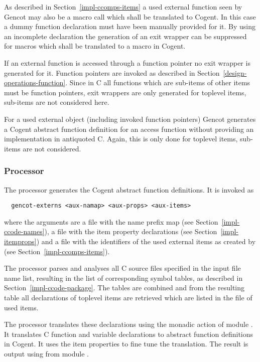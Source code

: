 As described in Section~\ref{impl-ccomps-items} a used external function seen by Gencot may also be a macro call 
which shall be translated to Cogent. In this case a dummy function declaration must have been manually provided 
for it. By using an incomplete declaration the generation of an exit wrapper can be suppressed for macros 
which shall be translated to a macro in Cogent.

If an external function is accessed through a function pointer no exit wrapper is generated for it.
Function pointers are invoked as described in Section~\ref{design-operations-function}. Since in C all functions
which are sub-items of other items must be function pointers, exit wrappers are only generated for toplevel
items, sub-items are not considered here.

For a used external object (including invoked function pointers) Gencot generates a Cogent abstract function 
definition for an access function without providing an implementation in antiquoted C. Again, this is only 
done for toplevel items, sub-items are not considered.

\subsubsection{Processor }

The processor  generates the Cogent abstract function definitions. It is invoked as
\begin{verbatim}
  gencot-externs <aux-namap> <aux-props> <aux-items>
\end{verbatim}
where the arguments are a file  with the name prefix map 
(see Section~\ref{impl-ccode-names}), a file  with the item property declarations (see 
Section~\ref{impl-itemprops}) and a file  with the identifiers of the used external items as created 
by  (see Section~\ref{impl-ccomps-items}).

The processor parses and analyses
all C source files specified in the input file name list, resulting in the list of corresponding symbol tables, as
described in Section~\ref{impl-ccode-package}. The tables are combined and from the resulting table all 
declarations of toplevel items are retrieved which are listed in the file of used items.

The processor translates these declarations using the monadic action  of
module . It translates C function and variable declarations to abstract function 
definitions in Cogent. It uses the item properties to fine tune the translation.
The result is output using  from module .


